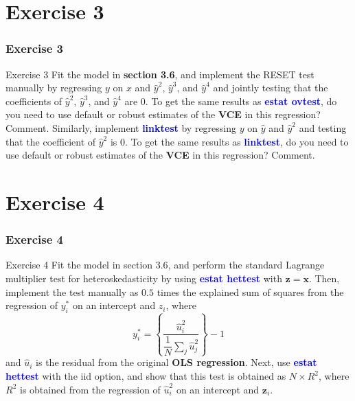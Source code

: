 \documentclass[11pt, aspectratio=169]{beamer}
\begin{document}
	\section{Exercise 3}
		\begin{frame}
			\frametitle{Exercise 3}
			\begin{block}{Exercise 3}
				Fit the model in \textcolor{red!50}{\textbf{section 3.6}}, and implement the RESET test manually by
				regressing $y$ on $x$ and $\hat{y}^{2}$, $\hat{y}^{3}$, and $\hat{y}^{4}$ and jointly testing that the
				coefficients of $\hat{y}^{2}$, $\hat{y}^{3}$, and $\hat{y}^{4}$ are $0$. 
				To get the same results as \textcolor{blue}{\textbf{estat ovtest}}, 
				do you need to use default or robust estimates of the \textbf{VCE} in
				this regression? Comment. Similarly, implement \textcolor{blue}{\textbf{linktest}} by
				regressing $y$ on $\hat{y}$ and $\hat{y}^{2}$ and testing that the coefficient of $\hat{y}^{2}$ is $0$. To
				get the same results as \textcolor{blue}{\textbf{linktest}}, do you need to use default or robust
				estimates of the \textbf{VCE} in this regression? Comment.
			\end{block}
		\end{frame}
	\section{Exercise 4}
		\begin{frame}
			\frametitle{Exercise 4}
			\begin{block}{Exercise 4}
				Fit the model in \textcolor{red!50}{section 3.6}, and perform the standard Lagrange
				multiplier test for heteroskedasticity by using \textcolor{blue}{\textbf{estat hettest}} with
				$\mathbf{z} = \mathbf{x}$. Then, implement the test manually as $0.5$ times the explained
				sum of squares from the regression of $y_{i}^{*}$ on an intercept and $z_{i}$, where
					\begin{equation}
						y_{i}^{*} = \left\{\dfrac{\hat{u}_{i}^{2}}{\dfrac{1}{N}\sum_{j} \hat{u}_{j}^{2}  } \right\} - 1
					\end{equation}
				and $\hat{u}_{i}$ is the residual from the original \textbf{OLS regression}. Next, use \textcolor{blue}{\textbf{estat hettest}} with the iid option, and
				show that this test is obtained as  $N\times R^{2}$, where $R^{2}$ is obtained from
				the regression of $\hat{u}_{i}^{2}$ on an intercept and $\mathbf{z}_{i}$.
			\end{block}
		\end{frame}
\end{document}
